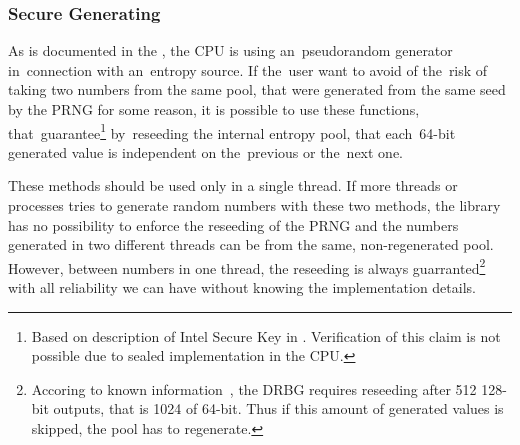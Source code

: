 \\

\\

\\

\\

\\

\subsubsection{Secure Generating}\label{subsec:api:secure}
\par{
As is documented in the , the CPU is using an~pseudorandom generator in~connection with an~entropy source. If the~user want to avoid of the~risk of taking two numbers from the same pool, that were generated from the same seed by the PRNG for some reason, it is possible to use these functions, that~guarantee\footnote{Based on description of Intel Secure Key in . Verification of this claim is not possible due to sealed implementation in the CPU.} by~reseeding the internal entropy pool, that each~64-bit generated value is independent on the~previous or the~next one. 
}

\par{
These methods should be used only in a single thread. 
If more threads or processes tries to generate random numbers with these two methods, 
the library has no possibility to enforce the reseeding of the PRNG and the numbers generated 
in two different threads can be from the same, non-regenerated pool.
However, between numbers in one thread, 
the reseeding is always guarranted\footnote{Accoring to known information~\cite[sec.~2.4.2]{AnalysisOfDRNG}, the DRBG requires reseeding after 512 128-bit outputs, that is 1024 of 64-bit. 
Thus if this amount of generated values is skipped, the pool has to regenerate.} 
with all reliability we can have without knowing the implementation details.
}



